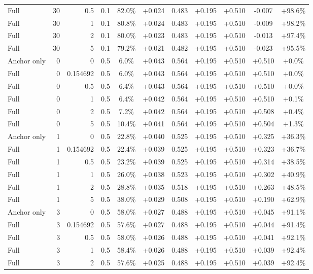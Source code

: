\begin{table}[htbp]
\begin{tabular}{lrrrccccccc}
Full & 30 & 0.5 & 0.1 & 82.0\% & +0.024 & 0.483 & +0.195 & +0.510 & -0.007 & +98.6\% \\
Full & 30 & 1 & 0.1 & 80.8\% & +0.024 & 0.483 & +0.195 & +0.510 & -0.009 & +98.2\% \\
Full & 30 & 2 & 0.1 & 80.0\% & +0.023 & 0.483 & +0.195 & +0.510 & -0.013 & +97.4\% \\
Full & 30 & 5 & 0.1 & 79.2\% & +0.021 & 0.482 & +0.195 & +0.510 & -0.023 & +95.5\% \\
Anchor only & 0 & 0 & 0.5 & 6.0\% & +0.043 & 0.564 & +0.195 & +0.510 & +0.510 & +0.0\% \\
Full & 0 & 0.154692 & 0.5 & 6.0\% & +0.043 & 0.564 & +0.195 & +0.510 & +0.510 & +0.0\% \\
Full & 0 & 0.5 & 0.5 & 6.4\% & +0.043 & 0.564 & +0.195 & +0.510 & +0.510 & +0.0\% \\
Full & 0 & 1 & 0.5 & 6.4\% & +0.042 & 0.564 & +0.195 & +0.510 & +0.510 & +0.1\% \\
Full & 0 & 2 & 0.5 & 7.2\% & +0.042 & 0.564 & +0.195 & +0.510 & +0.508 & +0.4\% \\
Full & 0 & 5 & 0.5 & 10.4\% & +0.041 & 0.564 & +0.195 & +0.510 & +0.504 & +1.3\% \\
Anchor only & 1 & 0 & 0.5 & 22.8\% & +0.040 & 0.525 & +0.195 & +0.510 & +0.325 & +36.3\% \\
Full & 1 & 0.154692 & 0.5 & 22.4\% & +0.039 & 0.525 & +0.195 & +0.510 & +0.323 & +36.7\% \\
Full & 1 & 0.5 & 0.5 & 23.2\% & +0.039 & 0.525 & +0.195 & +0.510 & +0.314 & +38.5\% \\
Full & 1 & 1 & 0.5 & 26.0\% & +0.038 & 0.523 & +0.195 & +0.510 & +0.302 & +40.9\% \\
Full & 1 & 2 & 0.5 & 28.8\% & +0.035 & 0.518 & +0.195 & +0.510 & +0.263 & +48.5\% \\
Full & 1 & 5 & 0.5 & 38.0\% & +0.029 & 0.508 & +0.195 & +0.510 & +0.190 & +62.9\% \\
Anchor only & 3 & 0 & 0.5 & 58.0\% & +0.027 & 0.488 & +0.195 & +0.510 & +0.045 & +91.1\% \\
Full & 3 & 0.154692 & 0.5 & 57.6\% & +0.027 & 0.488 & +0.195 & +0.510 & +0.044 & +91.4\% \\
Full & 3 & 0.5 & 0.5 & 58.0\% & +0.026 & 0.488 & +0.195 & +0.510 & +0.041 & +92.1\% \\
Full & 3 & 1 & 0.5 & 58.4\% & +0.026 & 0.488 & +0.195 & +0.510 & +0.039 & +92.4\% \\
Full & 3 & 2 & 0.5 & 57.6\% & +0.025 & 0.488 & +0.195 & +0.510 & +0.039 & +92.4\% \\

\end{tabular}
\end{table}
